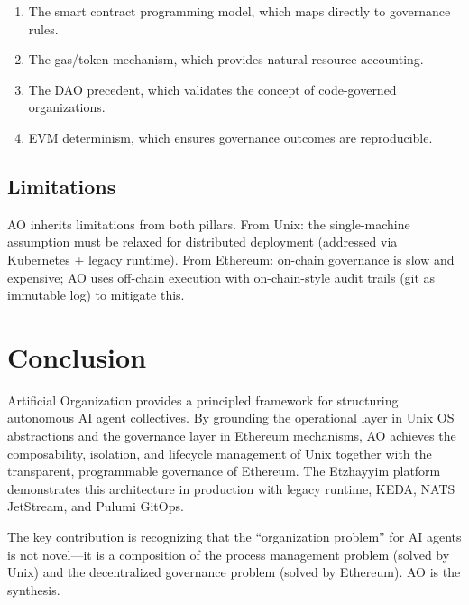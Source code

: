 \documentclass[11pt,a4paper]{article}
\begin{document}
\begin{enumerate}[nosep]
  \item The smart contract programming model, which maps directly to
    governance rules.
  \item The gas/token mechanism, which provides natural resource accounting.
  \item The DAO precedent, which validates the concept of code-governed
    organizations.
  \item EVM determinism, which ensures governance outcomes are reproducible.
\end{enumerate}

\subsection{Limitations}

AO inherits limitations from both pillars. From Unix: the single-machine
assumption must be relaxed for distributed deployment (addressed via
Kubernetes + legacy runtime). From Ethereum: on-chain governance is slow and
expensive; AO uses off-chain execution with on-chain-style audit trails
(git as immutable log) to mitigate this.

\section{Conclusion}

Artificial Organization provides a principled framework for structuring
autonomous AI agent collectives. By grounding the operational layer in
Unix OS abstractions and the governance layer in Ethereum mechanisms, AO
achieves the composability, isolation, and lifecycle management of Unix
together with the transparent, programmable governance of Ethereum. The
Etzhayyim platform demonstrates this architecture in production with legacy runtime,
KEDA, NATS JetStream, and Pulumi GitOps.

The key contribution is recognizing that the ``organization problem'' for
AI agents is not novel---it is a composition of the process management
problem (solved by Unix) and the decentralized governance problem (solved
by Ethereum). AO is the synthesis.
\end{document}
